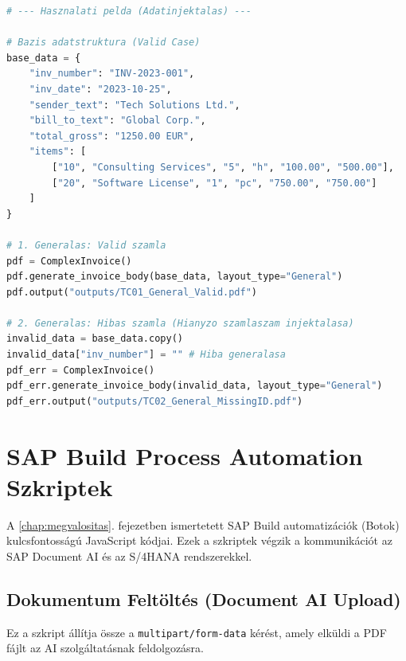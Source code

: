 \begin{lstlisting}[language=Python, caption={A számlageneráló motor (ComplexInvoice) és az adatinjektálás logikája}, label={code:app_python_full}]
# --- Hasznalati pelda (Adatinjektalas) ---

# Bazis adatstruktura (Valid Case)
base_data = {
    "inv_number": "INV-2023-001",
    "inv_date": "2023-10-25",
    "sender_text": "Tech Solutions Ltd.",
    "bill_to_text": "Global Corp.",
    "total_gross": "1250.00 EUR",
    "items": [
        ["10", "Consulting Services", "5", "h", "100.00", "500.00"],
        ["20", "Software License", "1", "pc", "750.00", "750.00"]
    ]
}

# 1. Generalas: Valid szamla
pdf = ComplexInvoice()
pdf.generate_invoice_body(base_data, layout_type="General")
pdf.output("outputs/TC01_General_Valid.pdf")

# 2. Generalas: Hibas szamla (Hianyzo szamlaszam injektalasa)
invalid_data = base_data.copy()
invalid_data["inv_number"] = "" # Hiba generalasa
pdf_err = ComplexInvoice()
pdf_err.generate_invoice_body(invalid_data, layout_type="General")
pdf_err.output("outputs/TC02_General_MissingID.pdf")
\end{lstlisting}

\section{SAP Build Process Automation Szkriptek}
\label{app:bpa_scripts}

A \ref{chap:megvalositas}. fejezetben ismertetett SAP Build automatizációk (Botok) kulcsfontosságú JavaScript kódjai. Ezek a szkriptek végzik a kommunikációt az SAP Document AI és az S/4HANA rendszerekkel.

\subsection{Dokumentum Feltöltés (Document AI Upload)}
\label{app:script_upload}

Ez a szkript állítja össze a \texttt{multipart/form-data} kérést, amely elküldi a PDF fájlt az AI szolgáltatásnak feldolgozásra.

